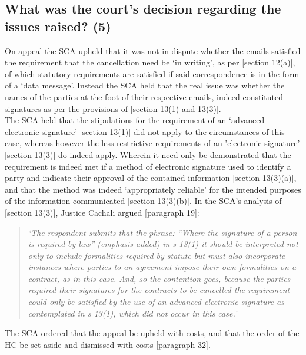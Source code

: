 \documentclass[11pt]{article}
\begin{document}
\subsection{What was the court's decision regarding the issues raised? (5)}
\label{sec:org6a3ce6c}

On appeal the SCA upheld that it was not in dispute whether the emails satisfied
the requirement that the cancellation need be `in writing', as per [section
12(a)]\cite{rsa02_elect_comm_trans_act}, of which statutory requirements are
satisfied if said correspondence is in the form of a `data message'. Instead the
SCA held that the real issue was whether the names of the parties at the foot of
their respective emails, indeed constituted signatures as per the provisions of
[section 13(1) and 13(3)]\cite{rsa02_elect_comm_trans_act}.\\

The SCA held that the stipulations for the requirement of an `advanced
electronic signature' [section 13(1)]\cite{rsa02_elect_comm_trans_act} did not
apply to the circumstances of this case, whereas however the less restrictive
requirements of an 'electronic signature' [section
13(3)]\cite{rsa02_elect_comm_trans_act} do indeed apply. Wherein it need only be
demonstrated that the requirement is indeed met if a method of electronic
signature used to identify a party and indicate their approval of the contained
information [section 13(3)(a)]\cite{rsa02_elect_comm_trans_act}, and that the method
was indeed `appropriately reliable' for the intended purposes of the information
communicated [section 13(3)(b)]\cite{rsa02_elect_comm_trans_act}. In the SCA's analysis of [section 13(3)]\cite{rsa02_elect_comm_trans_act}, Justice
Cachali argued [paragraph 19]\cite{Cachalia15_spring_forest_v_wilberry}:
\begin{quote}
\textit{‘The respondent submits that the phrase: “Where the signature of a person is required by law” (emphasis added) in s 13(1) it should be interpreted not only to include formalities required by statute but must also incorporate instances where parties to an agreement impose their own formalities on a contract, as in this case. And, so the contention goes, because the parties required their signatures for the contracts to be cancelled the requirement could only be satisfied by the use of an advanced electronic signature as contemplated in s 13(1), which did not occur in this case.’}
\end{quote}

The SCA ordered that the appeal be upheld with costs, and that the order of the
HC be set aside and dismissed with costs [paragraph 32]\cite{Cachalia15_spring_forest_v_wilberry}.
\end{document}

